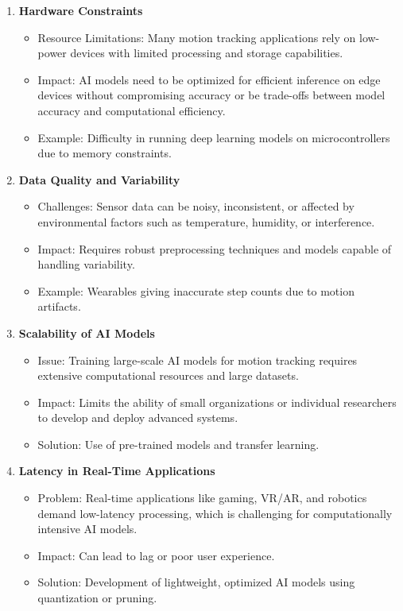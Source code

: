 \begin{enumerate}
    \item \textbf{Hardware Constraints}
        \begin{itemize}
            \item Resource Limitations: Many motion tracking applications rely on low-power devices with limited processing and storage capabilities.
            \item Impact: AI models need to be optimized for efficient inference on edge devices without compromising accuracy or be trade-offs between model accuracy and computational efficiency.
            \item Example: Difficulty in running deep learning models on microcontrollers due to memory constraints.
        \end{itemize}

    \item \textbf{Data Quality and Variability}
        \begin{itemize}
            \item Challenges: Sensor data can be noisy, inconsistent, or affected by environmental factors such as temperature, humidity, or interference.
            \item Impact: Requires robust preprocessing techniques and models capable of handling variability.
            \item Example: Wearables giving inaccurate step counts due to motion artifacts.
        \end{itemize}

    \item \textbf{Scalability of AI Models}
        \begin{itemize}
            \item Issue: Training large-scale AI models for motion tracking requires extensive computational resources and large datasets.
            \item Impact: Limits the ability of small organizations or individual researchers to develop and deploy advanced systems.
            \item Solution: Use of pre-trained models and transfer learning.
        \end{itemize}

    \item \textbf{Latency in Real-Time Applications}
        \begin{itemize}
            \item Problem: Real-time applications like gaming, VR/AR, and robotics demand low-latency processing, which is challenging for computationally intensive AI models.
            \item Impact: Can lead to lag or poor user experience.
            \item Solution: Development of lightweight, optimized AI models using quantization or pruning.
        \end{itemize}


\end{enumerate}
